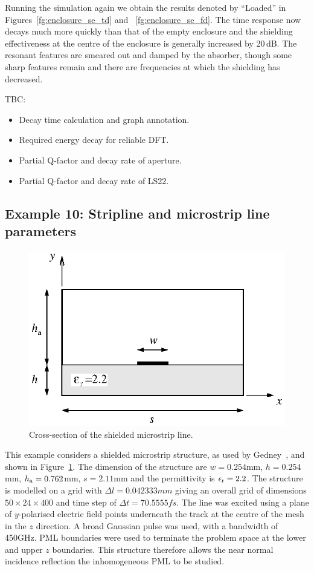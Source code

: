 \documentclass[onecolumn,a4paper]{article}
\numberwithin{equation}{section}
\begin{document}
Running the simulation again we obtain the results denoted by ``Loaded'' in Figures~\ref{fg:enclosure_se_td} 
and ~\ref{fg:enclosure_se_fd}. The time response now decays much more quickly than that of the empty enclosure 
and the shielding effectiveness at the centre of the enclosure is generally increased by 20\,dB. The resonant 
features are smeared out and damped by the absorber, though some sharp features remain and there are frequencies
at which the shielding has decreased. 

TBC:
\begin{itemize}
 \item Decay time calculation and graph annotation.
 \item Required energy decay for reliable DFT.
 \item Partial Q-factor and decay rate of aperture.
 \item Partial Q-factor and decay rate of LS22.
\end{itemize}

\subsection{Example 10: Stripline and microstrip line parameters}

\begin{figure}[ht]
\centerline{\includegraphics[width=0.4\linewidth]{figures/shielded_microstrip}}
\caption{\label{fg:shielded_microstrip}Cross-section of the shielded 
  microstrip line.}
\end{figure}

This example considers a shielded microstrip structure, as used by 
Gedney~\cite{Gedney1996a}, and shown in Figure~\ref{fg:shielded_microstrip}.  
The dimension of the structure are $w=0.254$\unit{mm}, $h=0.254$\unit{mm}, 
$h_{\mathrm{a}}=0.762$\unit{mm}, $s=2.11$\unit{mm} and the permittivity 
is $\epsilon_{\mathrm{r}}=2.2$. The structure is modelled on a grid with 
$\Delta l=0.042333\unit{mm}$ giving an overall grid of dimensions 
$50\times 24 \times 400$ and time step of $\Delta t=70.5555\unit{fs}$. 
The line was excited using a plane of $y$-polarised electric field points underneath the track at
the centre of the mesh in the $z$ direction. A broad Gaussian pulse
was used, with a bandwidth of 450\unit{GHz}. PML boundaries were used
to terminate the problem space at the lower and upper $z$ boundaries.
This structure therefore allows the near normal incidence reflection
the inhomogeneous PML to be studied.
\end{document}
